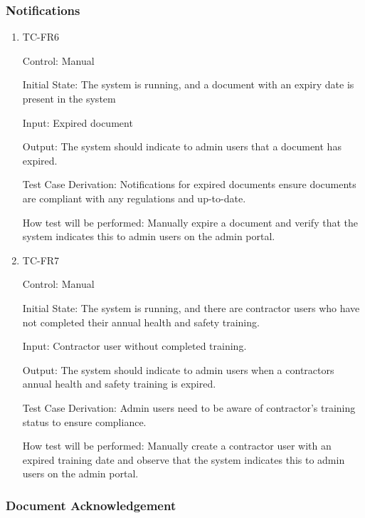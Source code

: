 \documentclass[12pt, titlepage]{article}
\begin{document}
\subsubsection{Notifications}

\begin{enumerate}
  \item {TC-FR6\\}

    Control: Manual

    Initial State: The system is running, and a document with an expiry date is present
    in the system

    Input: Expired document

    Output: The system should indicate to admin users that a document has expired.

    Test Case Derivation: Notifications for expired documents ensure documents are
    compliant with any regulations and up-to-date.

    How test will be performed: Manually expire a document and verify
    that the system indicates this to admin users on the admin portal.

  \item {TC-FR7\\}

    Control: Manual

    Initial State: The system is running, and there are contractor users who
    have not completed their annual health and safety training.

    Input: Contractor user without completed training.

    Output: The system should indicate to admin users when a contractors annual health and safety training is expired.

    Test Case Derivation: Admin users need to be aware of contractor's training
    status to ensure compliance.

    How test will be performed: Manually create a contractor user with an expired training date and observe that the system
    indicates this to admin users on the admin portal.

\end{enumerate}

\subsubsection{Document Acknowledgement}
\end{document}
